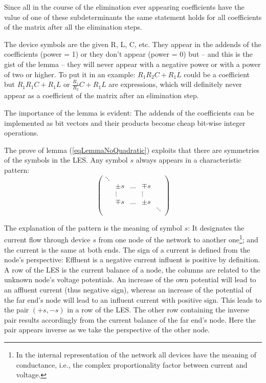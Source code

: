 \noindent
Since all in the course of the elimination ever appearing coefficients
have the value of one of these subdeterminants the same statement holds
for all coefficients of the matrix after all the elimination steps.

The device symbols are the given R, L, C, etc. They appear in the addends
of the coefficients (power = 1) or they don't appear (power = 0) but --
and this is the gist of the lemma -- they will never appear with a
negative power or with a power of two or higher. To put it in an example:
$R_1 R_2 C + R_1 L$ could be a coefficient but $R_1 R_1 C + R_1 L$ or
$\frac{R_1}{R_2} C + R_1 L$ are expressions, which will definitely never
appear as a coefficient of the matrix after an elimination step.

The importance of the lemma is evident: The addends of the coefficients
can be implemented as bit vectors and their products become cheap bit-wise
integer operations.

The prove of lemma (\ref{eqLemmaNoQuadratic}) exploits that there are
symmetries of the symbols in the LES. Any symbol $s$ always appears in a
characteristic pattern:
\begin{equation}
\label{eqMatrixPatternInS}
\left(
\begin{array}{ccccc}
\ddots & & & & \\
 & \pm s & \ldots & \mp s & \\
 & \vdots & & \vdots & \\
 & \mp s & \ldots & \pm s & \\
 & & & & \ddots \\
\end{array}
\right)
\end{equation}

The explanation of the pattern is the meaning of symbol $s$: It designates
the current flow through device $s$ from one node of the network to
another one\footnote{In the internal representation of the network all
devices have the meaning of conductance, i.e., the complex proportionality
factor between current and voltage.}; and the current is the same at both
ends. The sign of a current is defined from the node's perspective:
Effluent is a negative current influent is positive by definition. A row
of the LES is the current balance of a node, the columns are related to
the unknown node's voltage potentials. An increase of the own potential
will lead to an affluent current (thus negative sign), whereas an increase
of the potential of the far end's node will lead to an influent current
with positive sign. This leads to the pair $(+s, -s)$ in a row of the
LES. The other row containing the inverse pair results accordingly from
the current balance of the far end's node. Here the pair appears inverse
as we take the perspective of the other node.

